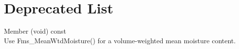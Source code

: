 \chapter{Deprecated List}
\hypertarget{deprecated}{}\label{deprecated}

\begin{DoxyRefList}
\item[Member \doxylink{class_dead_fuel_moisture_a1eca4a133de0836b7f49809acfeb411f}{Dead\+Fuel\+Moisture\+::mean\+Moisture} (void) const]\hfill \\
\label{deprecated__deprecated000001}%
%
Use Fms\+\_\+\+Mean\+Wtd\+Moisture() for a volume-\/weighted mean moisture content.
\end{DoxyRefList}